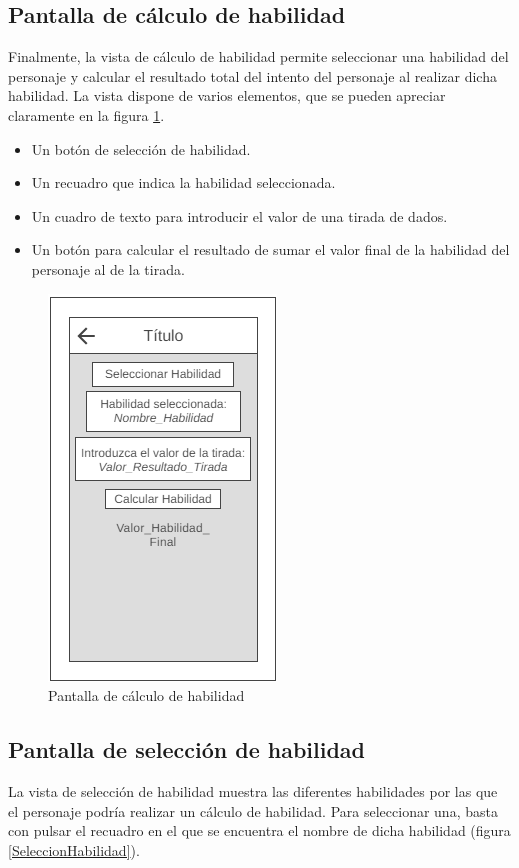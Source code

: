 \subsection{Pantalla de cálculo de habilidad}
Finalmente, la vista de cálculo de habilidad permite seleccionar una habilidad del personaje y 
calcular el resultado total del intento del personaje al realizar dicha habilidad. La vista dispone de varios elementos, 
que se pueden apreciar claramente en la figura \ref*{CalculoHabilidad}.
\begin{itemize}
    \item Un botón de selección de habilidad.
    \item Un recuadro que indica la habilidad seleccionada.
    \item Un cuadro de texto para introducir el valor de una tirada de dados.
    \item Un botón para calcular el resultado de sumar el valor final de la habilidad del personaje al de la tirada.
\end{itemize}

\begin{figure}[H]
    \centering
    \includegraphics[scale=0.6]{Figures/Mockups/Mock_CalcularHabilidad.png}
    \caption{Pantalla de cálculo de habilidad}
    \label{CalculoHabilidad}    
\end{figure}
\newpage
\subsection{Pantalla de selección de habilidad}
La vista de selección de habilidad muestra las diferentes habilidades por las que el personaje podría 
realizar un cálculo de habilidad. Para seleccionar una, basta con pulsar el recuadro en el que se encuentra 
el nombre de dicha habilidad (figura \ref*{SeleccionHabilidad}).

